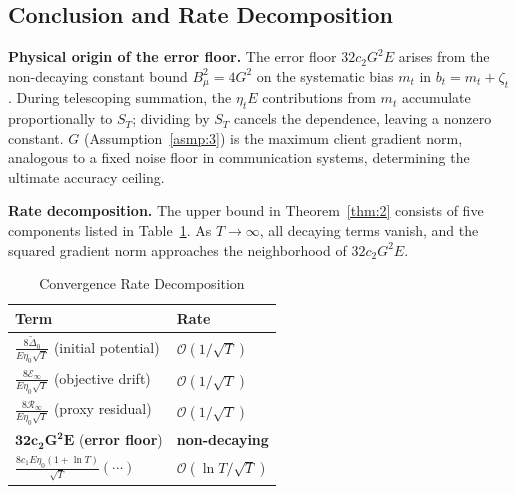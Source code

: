 \subsection{Conclusion and Rate Decomposition}

\noindent\textbf{Physical origin of the error floor.}
The error floor \(32 c_2 G^2 E\) arises from the non-decaying constant bound
\(B_\mu^2 = 4G^2\) on the systematic bias \(m_t\) in \(b_t = m_t + \zeta_t\).
During telescoping summation, the \(\eta_t E\) contributions from \(m_t\) accumulate proportionally to \(S_T\);
dividing by \(S_T\) cancels the dependence, leaving a nonzero constant.
\(G\) (Assumption~\ref{asmp:3}) is the maximum client gradient norm, analogous to a fixed noise floor in communication systems, determining the ultimate accuracy ceiling.

\noindent\textbf{Rate decomposition.}
The upper bound in Theorem~\ref{thm:2} consists of five components listed in Table~\ref{tab:rate}.
As \(T \to \infty\), all decaying terms vanish, and the squared gradient norm approaches the neighborhood of \(32 c_2 G^2 E\).

\begin{table}[h]
  \centering
  \caption{Convergence Rate Decomposition}\label{tab:rate}
  \begin{tabular}{p{}p{}}
    \toprule
    \textbf{Term} & \textbf{Rate} \\
    \midrule
    \(\frac{8\widetilde\Delta_0}{E\eta_0\sqrt{T}}\) (initial potential) & \(\mathcal O(1/\sqrt{T})\) \\
    \(\frac{8\mathcal E_\infty}{E\eta_0\sqrt{T}}\) (objective drift)    & \(\mathcal O(1/\sqrt{T})\) \\
    \(\frac{8\mathcal R_\infty}{E\eta_0\sqrt{T}}\) (proxy residual)     & \(\mathcal O(1/\sqrt{T})\) \\
    \(\mathbf{32 c_2 G^2 E}\) (\textbf{error floor})                    & \textbf{non-decaying} \\
    \(\frac{8c_1 E\eta_0(1+\ln T)}{\sqrt{T}}(\cdots)\)                  & \(\mathcal O(\ln T/\sqrt{T})\) \\
    \bottomrule
  \end{tabular}
\end{table}